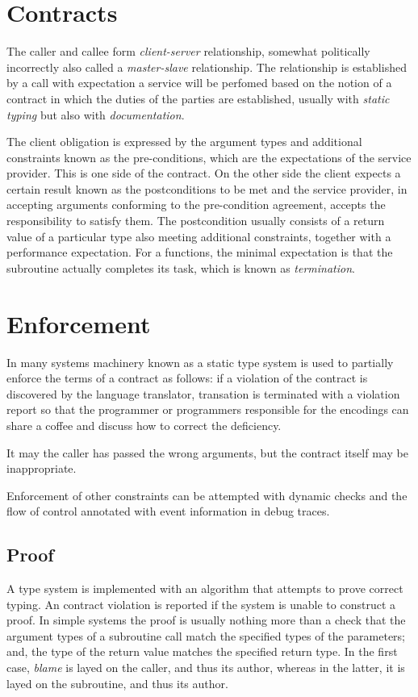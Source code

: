 \documentclass[oneside]{book}
\begin{document}
\section{Contracts}
The caller and callee form {\em client-server} relationship,
somewhat politically incorrectly also called a {\em master-slave}
relationship. The relationship is established by a call with expectation
a service will be perfomed based on the notion of a contract in which
the duties of the parties are established, usually with {\em static typing}
but also with {\em documentation}. 

The client obligation is expressed by the argument types and additional
constraints known as the pre-conditions, which are the expectations
of the service provider. This is one side of the contract. On the
other side the client expects a certain result known as the postconditions
to be met and the service provider, in accepting arguments conforming
to the pre-condition agreement, accepts the responsibility to satisfy
them. The postcondition usually consists of a return value of a particular
type also meeting additional constraints, together with a performance
expectation. For a functions, the minimal expectation is that the
subroutine actually completes its task, which is known as {\em termination}.

\section{Enforcement}
In many systems machinery known as a static type system is used to
partially enforce the terms of a contract as follows: if a violation
of the contract is discovered by the language translator, transation
is terminated with a violation report so that the programmer or
programmers responsible for the encodings can share a coffee and
discuss how to correct the deficiency.

It may the caller has passed the wrong arguments, but the contract
itself may be inappropriate.

Enforcement of other constraints can be attempted with dynamic
checks and the flow of control annotated with event information
in debug traces.

\subsection{Proof}
A type system is implemented with an algorithm that attempts to
prove correct typing. An contract violation is reported if
the system is unable to construct a proof.  In simple systems
the proof is usually nothing more than a check that the 
argument types of a subroutine call match the specified types
of the parameters; and, the type of the return value matches
the specified return type. In the first case, {\em blame} is
layed on the caller, and thus its author, whereas in the latter,
it is layed on the subroutine, and thus its author.
\end{document}

